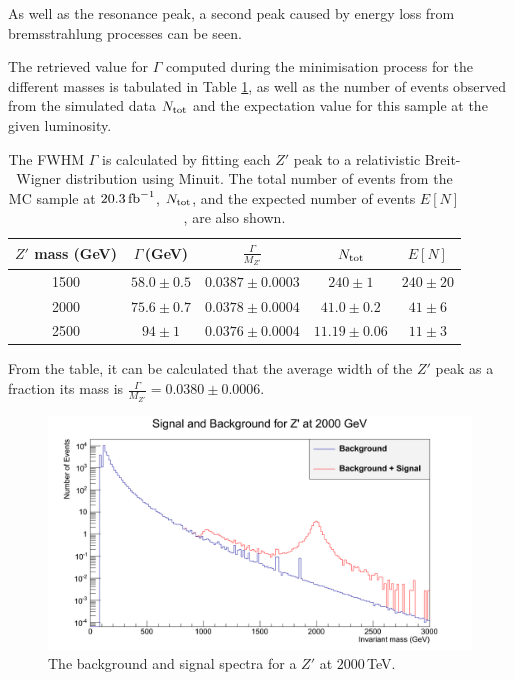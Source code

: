 \documentclass{article}
\begin{document}
As well as the resonance peak, a second peak caused by energy loss from bremsstrahlung processes can be seen. 

The retrieved value for $\Gamma$ computed during the minimisation process for the different masses is tabulated in Table \ref{table:resonanceWidth}, as well as the number of events observed from the simulated data $N_{\rm{tot}}$ and the expectation value for this sample at the given luminosity.

\begin{table}[h!t]
\centering
\caption{The FWHM $\Gamma$ is calculated by fitting each $Z'$ peak to a relativistic Breit-Wigner distribution using Minuit. The total number of events from the  MC sample at $20.3\,\rm{fb}^{-1}$, $N_{\rm{tot}}$, and the expected number of events $E[N]$, are also shown. \label{table:resonanceWidth}}
\begin{tabular}{ |c|c|c|c|c| } 
\hline
$Z'$ mass (GeV) & $\Gamma\,$(GeV) & $\frac{\Gamma}{M_{Z'}}$ & $N_{\rm{tot}}$ & $E[N]$\\
\hline
1500 & $58.0\pm0.5$ & $0.0387\pm0.0003$ & $240\pm1$			& $240\pm20$\\
2000 & $75.6\pm0.7$ & $0.0378\pm0.0004$ & $41.0\pm0.2$		& $41\pm6$\\
2500 & $94\pm1$ & $0.0376\pm0.0004$ 	& $11.19\pm0.06$	& $11\pm3$\\
\hline
\end{tabular}
\end{table}

From the table, it can be calculated that the average width of the $Z'$ peak as a fraction its mass is $\frac{\Gamma}{M_{Z'}} = 0.0380\pm0.0006$.

\begin{figure}[h]
    \centering
    \includegraphics[scale=0.3]{images/backgroundSignal.png}
    \caption{ The background and signal spectra for a $Z'$ at $2000\,$TeV. \label{fig:backgroundSignal}}
\end{figure}
\end{document}
